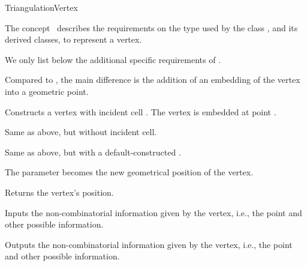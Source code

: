 \begin{ccRefConcept}{TriangulationVertex}

\ccDefinition

The concept \ccRefName\ describes the requirements on the type used by the
class , and its derived classes, to
represent a vertex.

\ccRefines


We only list below the additional specific requirements of \ccRefName.

Compared to , the main difference is the addition of
an embedding of the vertex into a geometric point.

\ccHasModels


\ccTypes


\ccCreation
{}

%
{Constructs a vertex with incident cell . The vertex is embedded at point .}

\ccGlue{}%
{Same as above, but without incident cell.}%

\ccGlue{}%
{Same as above, but with a default-constructed .}

\ccOperations

%
{The parameter  becomes the new geometrical position of the vertex.}

%
{Returns the vertex's position.}


%
{Inputs the non-combinatorial information given by the vertex, {i.e.},
the point and other possible information.}

%
{Outputs the non-combinatorial information given by the vertex, {i.e.},
the point and other possible information.}

\ccSeeAlso

\\
\\

\end{ccRefConcept}
